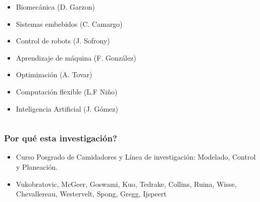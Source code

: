 {\begin{frame}
{\begin{columns}[T]
\begin{column}{4cm}
{{\begin{itemize}
            \item Biomec\'anica (D. Garzon)
            \item Sistemas embebidos (C. Camargo)
            \item Control de robots (J. Sofrony)
            \item Aprendizaje de m\'aquina (F. Gonz\'alez)
            \item Optimizaci\'on (A. Tovar)
            \item Computaci\'on flexible (L.F Ni\~no)
            \item Inteligencia Artificial (J. G\'omez)
            \end{itemize}
          }
        }
      \end{column}
    \end{columns}
  }
\end{frame}
\begin{frame}
  \frametitle{Por qu\'e esta investigaci\'on?}
  \begin{itemize}
  \item Curso Posgrado de Camidadores y L\'inea de investigaci\'on: Modelado, Control y Planeaci\'on.
  \item Vukobratovic, McGeer, Goswami, Kuo, Tedrake, Collins, Ruina, Wisse, Chevallereau, Westervelt, Spong, Gregg, Ijspeert

\end{itemize}
\end{frame}}
